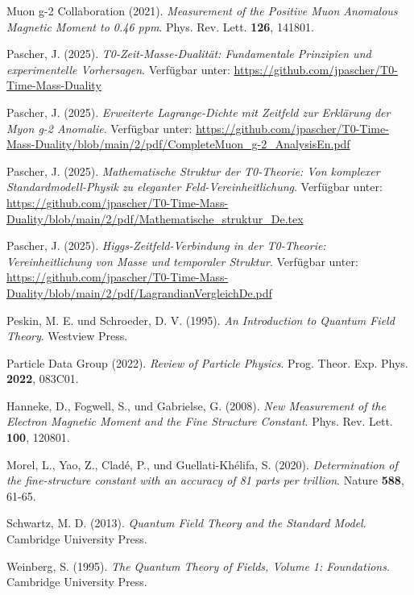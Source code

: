 \documentclass[12pt,a4paper]{article}
\theoremstyle{definition}
\begin{document}
	\begin{thebibliography}{20}
		
		Muon g-2 Collaboration (2021). 
		\textit{Measurement of the Positive Muon Anomalous Magnetic Moment to 0.46 ppm}. 
		Phys. Rev. Lett. \textbf{126}, 141801.
		
		Pascher, J. (2025). 
		\textit{T0-Zeit-Masse-Dualität: Fundamentale Prinzipien und experimentelle Vorhersagen}. 
		Verfügbar unter: \url{https://github.com/jpascher/T0-Time-Mass-Duality}
		
		Pascher, J. (2025). 
		\textit{Erweiterte Lagrange-Dichte mit Zeitfeld zur Erklärung der Myon g-2 Anomalie}. 
		Verfügbar unter: \url{https://github.com/jpascher/T0-Time-Mass-Duality/blob/main/2/pdf/CompleteMuon_g-2_AnalysisEn.pdf}
		
		Pascher, J. (2025). 
		\textit{Mathematische Struktur der T0-Theorie: Von komplexer Standardmodell-Physik zu eleganter Feld-Vereinheitlichung}. 
		Verfügbar unter: \url{https://github.com/jpascher/T0-Time-Mass-Duality/blob/main/2/pdf/Mathematische_struktur_De.tex}
		
		Pascher, J. (2025). 
		\textit{Higgs-Zeitfeld-Verbindung in der T0-Theorie: Vereinheitlichung von Masse und temporaler Struktur}. 
		Verfügbar unter: \url{https://github.com/jpascher/T0-Time-Mass-Duality/blob/main/2/pdf/LagrandianVergleichDe.pdf}
		
		Peskin, M. E. und Schroeder, D. V. (1995). 
		\textit{An Introduction to Quantum Field Theory}. 
		Westview Press.
		
		Particle Data Group (2022). 
		\textit{Review of Particle Physics}. 
		Prog. Theor. Exp. Phys. \textbf{2022}, 083C01.
		
		Hanneke, D., Fogwell, S., und Gabrielse, G. (2008). 
		\textit{New Measurement of the Electron Magnetic Moment and the Fine Structure Constant}. 
		Phys. Rev. Lett. \textbf{100}, 120801.
		
		Morel, L., Yao, Z., Cladé, P., und Guellati-Khélifa, S. (2020). 
		\textit{Determination of the fine-structure constant with an accuracy of 81 parts per trillion}. 
		Nature \textbf{588}, 61-65.
		
		Schwartz, M. D. (2013). 
		\textit{Quantum Field Theory and the Standard Model}. 
		Cambridge University Press.
		
		Weinberg, S. (1995). 
		\textit{The Quantum Theory of Fields, Volume 1: Foundations}. 
		Cambridge University Press.
		
	\end{thebibliography}
	
\end{document}
